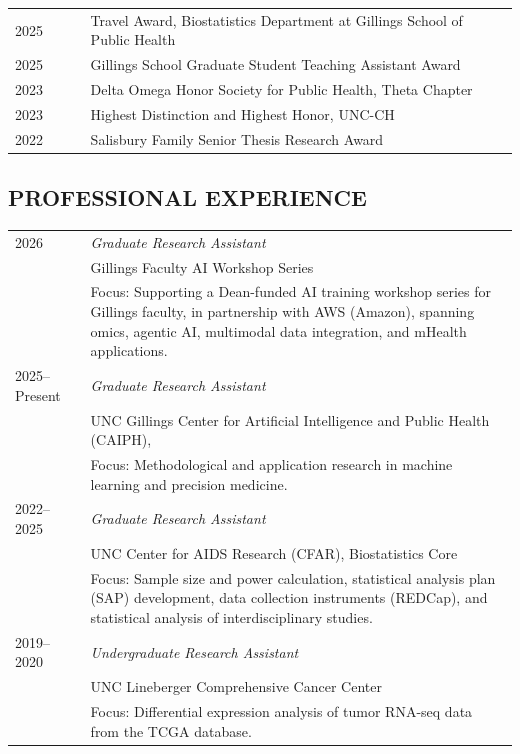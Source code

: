 \documentclass[11pt]{scrartcl}
\begin{document}
{{\begin{longtable}{p{0.15\linewidth}p{0.85\linewidth}}
  2025 & Travel Award, Biostatistics Department at Gillings School of Public Health \\
  
  2025 & Gillings School Graduate Student Teaching Assistant Award \\

  2023 & Delta Omega Honor Society for Public Health, Theta Chapter \\

  2023 & Highest Distinction and Highest Honor, UNC-CH \\
  
  2022 & Salisbury Family Senior Thesis Research Award \\
\end{longtable}%
}


\subsection{\MakeUppercase{Professional Experience}}
\noindent
{\def\arraystretch{1.1}\tabcolsep=0pt
\begin{longtable}{p{0.15\linewidth}p{0.85\linewidth}}

    2026  & \textit{Graduate Research Assistant}\\
     & Gillings Faculty AI Workshop Series \\
     & Focus: Supporting a Dean-funded AI training workshop series for Gillings faculty, in partnership with AWS (Amazon), spanning omics, agentic AI, multimodal data integration, and mHealth applications. \\

    2025--Present & \textit{Graduate Research Assistant}\\
     & UNC Gillings Center for Artificial Intelligence and Public Health (CAIPH), \\
     & Focus: Methodological and application research in machine learning and precision medicine.  \\

    2022--2025 & \textit{Graduate Research Assistant} \\
     & UNC Center for AIDS Research (CFAR), Biostatistics Core  \\
     & Focus: Sample size and power calculation, statistical analysis plan (SAP) development, data collection instruments (REDCap), and statistical analysis of interdisciplinary studies. \\

    2019--2020    & \textit{Undergraduate Research Assistant} \\
    & UNC Lineberger Comprehensive Cancer Center  \\
    & Focus: Differential expression analysis of tumor RNA-seq data from the TCGA database. \\


\end{longtable}}}
\end{document}
